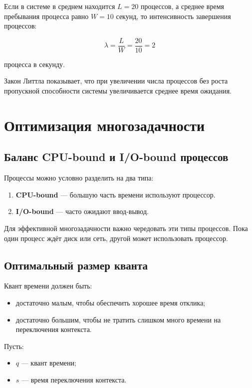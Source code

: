 \documentclass[12pt,a4paper]{article}
\begin{document}
Если в системе в среднем находится $L = 20$ процессов, а среднее время пребывания процесса равно $W = 10$ секунд, то интенсивность завершения процессов:

\[
\lambda = \frac{L}{W} = \frac{20}{10} = 2
\]

процесса в секунду.

Закон Литтла показывает, что при увеличении числа процессов без роста пропускной способности системы увеличивается среднее время ожидания.

\section{Оптимизация многозадачности}

\subsection{Баланс CPU-bound и I/O-bound процессов}

Процессы можно условно разделить на два типа:

\begin{enumerate}
    \item \textbf{CPU-bound} --- большую часть времени используют процессор.
    \item \textbf{I/O-bound} --- часто ожидают ввод-вывод.
\end{enumerate}

Для эффективной многозадачности важно чередовать эти типы процессов. Пока один процесс ждёт диск или сеть, другой может использовать процессор.

\subsection{Оптимальный размер кванта}

Квант времени должен быть:

\begin{itemize}
    \item достаточно малым, чтобы обеспечить хорошее время отклика;
    \item достаточно большим, чтобы не тратить слишком много времени на переключения контекста.
\end{itemize}

Пусть:

\begin{itemize}
    \item $q$ --- квант времени;
    \item $s$ --- время переключения контекста.
\end{itemize}
\end{document}
